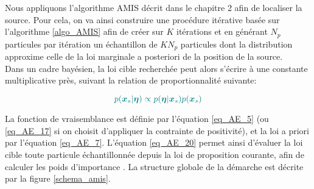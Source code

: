 Nous appliquons l'algorithme AMIS décrit dans le chapitre 2 afin de localiser la source. Pour cela, on va ainsi construire une procédure itérative basée sur l'algorithme \ref{algo_AMIS} afin de créer sur $K$ itérations et en générant $N_p$ particules par itération un échantillon de $KN_p$ particules  dont la distribution approxime celle de la loi marginale a posteriori  de la position de la source.\\

Dans un cadre bayésien, la loi cible recherchée peut alors s'écrire à une constante multiplicative près, suivant la relation de proportionnalité suivante:

\begin{equation}
\NdFS{
p(\PosSource | \VecObs) \propto p(\VecObs | \PosSource)p(\PosSource)
\label{eq_AE_20}
}
\end{equation}

La fonction de vraisemblance  est définie par l'équation \eqref{eq_AE_5} (ou \eqref{eq_AE_17} si on choisit d'appliquer la contrainte de positivité), et la loi a priori  par l'équation \eqref{eq_AE_7}. L'équation \eqref{eq_AE_20} permet ainsi d'évaluer la loi cible toute particule \NdFS{$\PosSource$} échantillonnée depuis la loi de proposition courante, afin de calculer les poids d'importance . La structure globale de la démarche est décrite par la figure \ref{schema_amis}.\\


